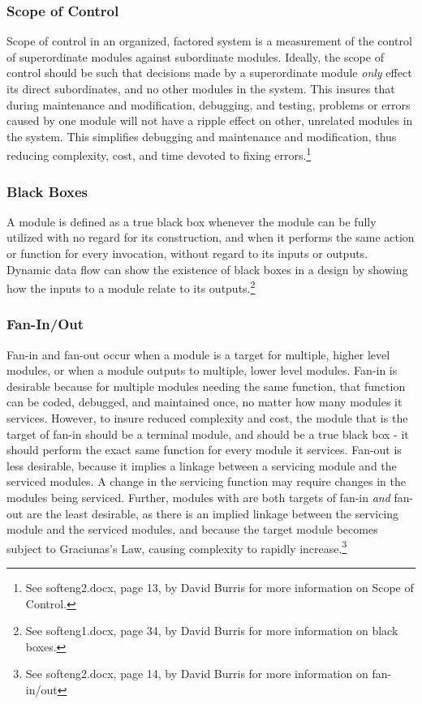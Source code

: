 \documentclass{article}
\begin{document}
		\subsubsection{Scope of Control}
			Scope of control in an organized, factored system is a measurement of the control of superordinate modules against subordinate modules. Ideally, the scope of control should be such that decisions made by a superordinate module \emph{only} effect its direct subordinates, and no other modules in the system. This insures that during maintenance and modification, debugging, and testing, problems or errors caused by one module will not have a ripple effect on other, unrelated modules in the system. This simplifies debugging and maintenance and modification, thus reducing complexity, cost, and time devoted to fixing errors.\footnote{See softeng2.docx, page 13, by David Burris for more information on Scope of Control.}  
		\subsubsection{Black Boxes}
			A module is defined as a true black box whenever the module can be fully utilized with no regard for its construction, and when it performs the same action or function for every invocation, without regard to its inputs or outputs. Dynamic data flow can show the existence of black boxes in a design by showing how the inputs to a module relate to its outputs.\footnote{See softeng1.docx, page 34, by David Burris for more information on black boxes.} 
		\subsubsection{Fan-In/Out}
			Fan-in and fan-out occur when a module is a target for multiple, higher level modules, or when a module outputs to multiple, lower level modules. Fan-in is desirable because for multiple modules needing the same function, that function can be coded, debugged, and maintained once, no matter how many modules it services. However, to insure reduced complexity and cost, the module that is the target of fan-in should be a terminal module, and should be a true black box - it should perform the exact same function for every module it services. Fan-out is less desirable, because it implies a linkage between a servicing module and the serviced modules. A change in the servicing function may require changes in the modules being serviced. Further, modules with are both targets of fan-in \emph{and} fan-out are the least desirable, as there is an implied linkage between the servicing module and the serviced modules, and because the target module becomes subject to Graciunas's Law, causing complexity to rapidly increase.\footnote{See softeng2.docx, page 14, by David Burris for more information on fan-in/out} 
\end{document}
